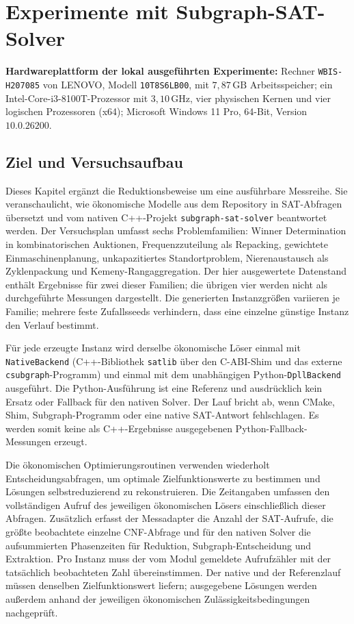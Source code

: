 \documentclass[a4paper,12pt]{article}
\newcommand{\experimenthardware}{%
	\par\smallskip\noindent
	\textbf{Hardwareplattform der lokal ausgeführten Experimente:} Rechner \texttt{WBIS-H207085} von LENOVO, Modell \texttt{10T8S6LB00}, mit $7{,}87\,\mathrm{GB}$ Arbeitsspeicher; ein Intel-Core-i3-8100T-Prozessor mit $3{,}10\,\mathrm{GHz}$, vier physischen Kernen und vier logischen Prozessoren (x64); Microsoft Windows 11 Pro, 64-Bit, Version $10.0.26200$.
	\par\smallskip}
\theoremstyle{definition}
\begin{document}
\section{Experimente mit Subgraph-SAT-Solver}
\label{eco:experiments}

\experimenthardware

\subsection{Ziel und Versuchsaufbau}
Dieses Kapitel ergänzt die Reduktionsbeweise um eine ausführbare Messreihe. Sie veranschaulicht, wie ökonomische Modelle aus dem Repository in SAT-Abfragen übersetzt und vom nativen C++-Projekt \texttt{subgraph-sat-solver} beantwortet werden. Der Versuchsplan umfasst sechs Problemfamilien: Winner Determination in kombinatorischen Auktionen, Frequenzzuteilung als Repacking, gewichtete Einmaschinenplanung, unkapazitiertes Standortproblem, Nierenaustausch als Zyklenpackung und Kemeny-Rangaggregation. Der hier ausgewertete Datenstand enthält Ergebnisse für zwei dieser Familien; die übrigen vier werden nicht als durchgeführte Messungen dargestellt. Die generierten Instanzgrößen variieren je Familie; mehrere feste Zufallsseeds verhindern, dass eine einzelne günstige Instanz den Verlauf bestimmt.

Für jede erzeugte Instanz wird derselbe ökonomische Löser einmal mit \texttt{NativeBackend} (C++-Bibliothek \texttt{satlib} über den C-ABI-Shim und das externe \texttt{csubgraph}-Programm) und einmal mit dem unabhängigen Python-\texttt{DpllBackend} ausgeführt. Die Python-Ausführung ist eine Referenz und ausdrücklich kein Ersatz oder Fallback für den nativen Solver. Der Lauf bricht ab, wenn CMake, Shim, Subgraph-Programm oder eine native SAT-Antwort fehlschlagen. Es werden somit keine als C++-Ergebnisse ausgegebenen Python-Fallback-Messungen erzeugt.

Die ökonomischen Optimierungsroutinen verwenden wiederholt Entscheidungsabfragen, um optimale Zielfunktionswerte zu bestimmen und Lösungen selbstreduzierend zu rekonstruieren. Die Zeitangaben umfassen den vollständigen Aufruf des jeweiligen ökonomischen Lösers einschließlich dieser Abfragen. Zusätzlich erfasst der Messadapter die Anzahl der SAT-Aufrufe, die größte beobachtete einzelne CNF-Abfrage und für den nativen Solver die aufsummierten Phasenzeiten für Reduktion, Subgraph-Entscheidung und Extraktion. Pro Instanz muss der vom Modul gemeldete Aufrufzähler mit der tatsächlich beobachteten Zahl übereinstimmen. Der native und der Referenzlauf müssen denselben Zielfunktionswert liefern; ausgegebene Lösungen werden außerdem anhand der jeweiligen ökonomischen Zulässigkeitsbedingungen nachgeprüft.
\end{document}

